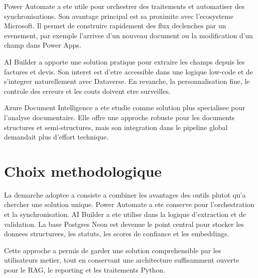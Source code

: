 Power Automate a ete utile pour orchestrer des traitements et automatiser des synchronisations. Son avantage principal est sa proximite avec l'ecosysteme Microsoft. Il permet de construire rapidement des flux declenches par un evenement, par exemple l'arrivee d'un nouveau document ou la modification d'un champ dans Power Apps.

AI Builder a apporte une solution pratique pour extraire les champs depuis les factures et devis. Son interet est d'etre accessible dans une logique low-code et de s'integrer naturellement avec Dataverse. En revanche, la personnalisation fine, le controle des erreurs et les couts doivent etre surveilles.

Azure Document Intelligence a ete etudie comme solution plus specialisee pour l'analyse documentaire. Elle offre une approche robuste pour les documents structures et semi-structures, mais son integration dans le pipeline global demandait plus d'effort technique.

\section{Choix methodologique}

La demarche adoptee a consiste a combiner les avantages des outils plutot qu'a chercher une solution unique. Power Automate a ete conserve pour l'orchestration et la synchronisation. AI Builder a ete utilise dans la logique d'extraction et de validation. La base Postgres Neon est devenue le point central pour stocker les donnees structurees, les statuts, les scores de confiance et les embeddings.

Cette approche a permis de garder une solution comprehensible par les utilisateurs metier, tout en conservant une architecture suffisamment ouverte pour le RAG, le reporting et les traitements Python.
